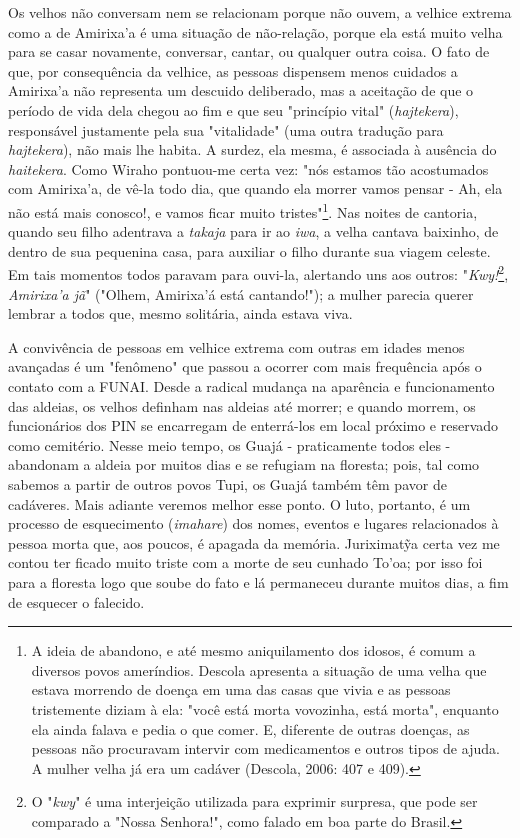 Os velhos não conversam nem se relacionam porque não ouvem, a velhice
extrema como a de Amirixa'a é uma situação de não-relação, porque ela
está muito velha para se casar novamente, conversar, cantar, ou qualquer
outra coisa. O fato de que, por consequência da velhice, as pessoas
dispensem menos cuidados a Amirixa'a não representa um descuido
deliberado, mas a aceitação de que o período de vida dela chegou ao fim
e que seu "princípio vital" (\emph{hajtekera}), responsável justamente
pela sua "vitalidade" (uma outra tradução para \emph{hajtekera}), não
mais lhe habita. A surdez, ela mesma, é associada à ausência do
\emph{haitekera}. Como Wiraho pontuou-me certa vez: "nós estamos tão
acostumados com Amirixa'a, de vê-la todo dia, que quando ela morrer
vamos pensar - Ah, ela não está mais conosco!, e vamos ficar muito
tristes"\footnote{A ideia de abandono, e até mesmo aniquilamento dos
  idosos, é comum a diversos povos ameríndios. Descola apresenta a
  situação de uma velha que estava morrendo de doença em uma das casas
  que vivia e as pessoas tristemente diziam à ela: "você está morta
  vovozinha, está morta", enquanto ela ainda falava e pedia o que comer.
  E, diferente de outras doenças, as pessoas não procuravam intervir com
  medicamentos e outros tipos de ajuda. A mulher velha já era um cadáver
  (Descola, 2006: 407 e 409).}. Nas noites de cantoria, quando seu filho
adentrava a \emph{takaja} para ir ao \emph{iwa}, a velha cantava
baixinho, de dentro de sua pequenina casa, para auxiliar o filho durante
sua viagem celeste. Em tais momentos todos paravam para ouvi-la,
alertando uns aos outros: "\emph{Kwy!}\footnote{O "\emph{kwy}" é uma
  interjeição utilizada para exprimir surpresa, que pode ser comparado a
  "Nossa Senhora!", como falado em boa parte do Brasil.},
\emph{Amirixa'a jã}" ("Olhem, Amirixa'á está cantando!"); a mulher
parecia querer lembrar a todos que, mesmo solitária, ainda estava viva.

A convivência de pessoas em velhice extrema com outras em idades menos
avançadas é um "fenômeno" que passou a ocorrer com mais frequência após
o contato com a FUNAI. Desde a radical mudança na aparência e
funcionamento das aldeias, os velhos definham nas aldeias até morrer; e
quando morrem, os funcionários dos PIN se encarregam de enterrá-los em
local próximo e reservado como cemitério. Nesse meio tempo, os Guajá -
praticamente todos eles - abandonam a aldeia por muitos dias e se
refugiam na floresta; pois, tal como sabemos a partir de outros povos
Tupi, os Guajá também têm pavor de cadáveres. Mais adiante veremos
melhor esse ponto. O luto, portanto, é um processo de esquecimento
(\emph{imahare}) dos nomes, eventos e lugares relacionados à pessoa
morta que, aos poucos, é apagada da memória. Juriximatỹa certa vez me
contou ter ficado muito triste com a morte de seu cunhado To'oa; por
isso foi para a floresta logo que soube do fato e lá permaneceu durante
muitos dias, a fim de esquecer o falecido.

